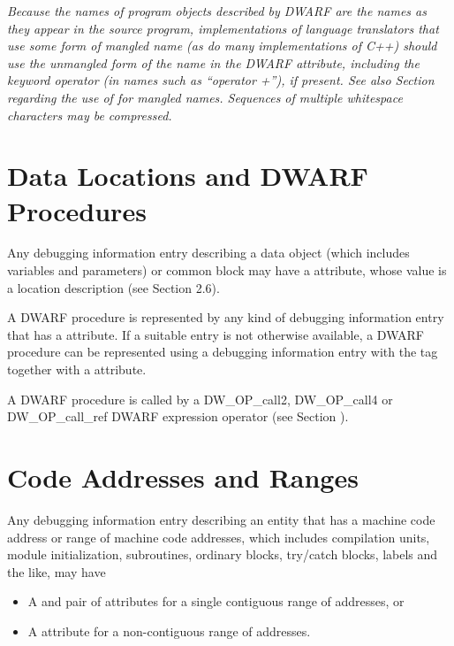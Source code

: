 \textit{Because the names of program objects described by DWARF are the
names as they appear in the source program, implementations
of language translators that use some form of mangled name
(as do many implementations of C++) should use the unmangled
form of the name in the DWARF  attribute,
including the keyword operator (in names such as “operator
+”), if present. See also 
Section  regarding the use
of  for mangled names. Sequences of
multiple whitespace characters may be compressed.}

\section{Data Locations and DWARF Procedures}
Any debugging information entry describing a data object (which
includes variables and parameters) or common block may have a
 attribute, whose value is a location description
(see Section 2.6).  

A DWARF procedure is represented by any
kind of debugging information entry that has a 
attribute. If a suitable entry is not otherwise available,
a DWARF procedure can be represented using a debugging
information entry with the 
tag 
together with a  attribute.  

A DWARF procedure
is called by a DW\-\_OP\-\_call2, 
DW\-\_OP\-\_call4 or 
DW\-\_OP\-\_call\-\_ref
DWARF expression operator 
(see Section ).

\section{Code Addresses and Ranges}
\label{chap:codeaddressesandranges}
Any debugging information entry describing an entity that has
a machine code address or range of machine code addresses,
which includes compilation units, module initialization,
subroutines, ordinary blocks, try/catch blocks, labels and
the like, may have

\begin{itemize}
\item A  and  pair of 
attributes for a single contiguous range of
addresses, or

\item A  attribute for a non-contiguous range of addresses.
\end{itemize}

